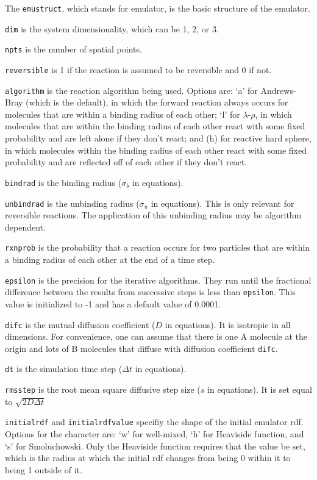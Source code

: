 \documentclass {book}
\begin{document}
The \texttt{emustruct}, which stands for emulator, is the basic structure of the emulator.

\texttt{dim} is the system dimensionality, which can be 1, 2, or 3.

\texttt{npts} is the number of spatial points.

\texttt{reversible} is 1 if the reaction is assumed to be reversible and 0 if not.

\texttt{algorithm} is the reaction algorithm being used.  Options are: `a' for Andrews-Bray (which is the default), in which the forward reaction always occurs for molecules that are within a binding radius of each other; `l' for $\lambda$-$\rho$, in which molecules that are within the binding radius of each other react with some fixed probability and are left alone if they don't react; and (h) for reactive hard sphere, in which molecules within the binding radius of each other react with some fixed probability and are reflected off of each other if they don't react.

\texttt{bindrad} is the binding radius ($\sigma_b$ in equations).

\texttt{unbindrad} is the unbinding radius ($\sigma_u$ in equations). This is only relevant for reversible reactions.  The application of this unbinding radius may be algorithm dependent.

\texttt{rxnprob} is the probability that a reaction occurs for two particles that are within a binding radius of each other at the end of a time step.

\texttt{epsilon} is the precision for the iterative algorithms.  They run until the fractional difference between the results from successive steps is less than \texttt{epsilon}.  This value is initialized to -1 and has a default value of 0.0001.

\texttt{difc} is the mutual diffusion coefficient ($D$ in equations). It is isotropic in all dimensions. For convenience, one can assume that there is one A molecule at the origin and lots of B molecules that diffuse with diffusion coefficient \texttt{difc}.

\texttt{dt} is the simulation time step ($\Delta t$ in equations).

\texttt{rmsstep} is the root mean square diffusive step size ($s$ in equations). It is set equal to $\sqrt{2D\Delta t}$

\texttt{initialrdf} and \texttt{initialrdfvalue} specifiy the shape of the initial emulator rdf. Options for the character are: `w' for well-mixed, `h' for Heaviside function, and `s' for Smoluchowski. Only the Heaviside function requires that the value be set, which is the radius at which the initial rdf changes from being 0 within it to being 1 outside of it.
\end{document}
